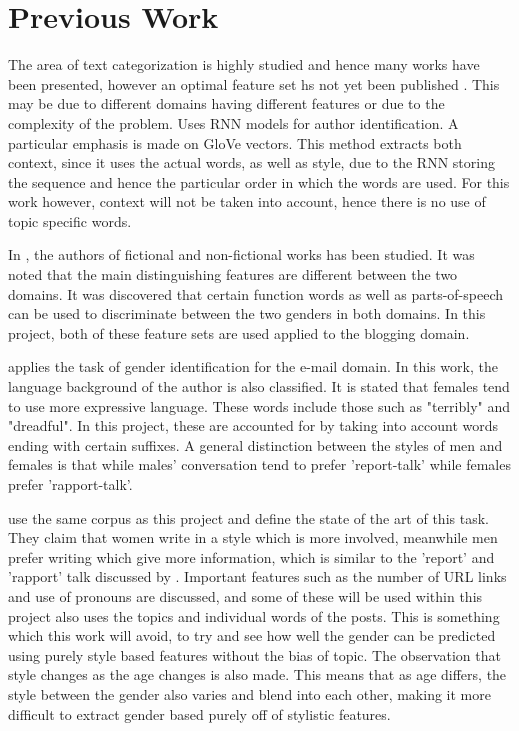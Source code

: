 \section{Previous Work}
The area of text categorization is highly studied and hence many works have been presented, however an optimal feature set hs not yet been published \cite{1}. This may be due to different domains having different features or due to the complexity of the problem. \cite{1} Uses RNN models for author identification. A particular emphasis is made on GloVe vectors. This method extracts both context, since it uses the actual words, as well as style, due to the RNN storing the sequence and hence the particular order in which the words are used. For this work however, context will not be taken into account, hence there is no use of topic specific words.

In \cite{3}, the authors of fictional and non-fictional works has been studied. It was noted that the main distinguishing features are different between the two domains. It was discovered that certain function words as well as parts-of-speech can be used to discriminate between the two genders in both domains. In this project, both of these feature sets are used applied to the blogging domain.

\cite{4} applies the task of gender identification for the e-mail domain. In this work, the language background of the author is also classified. It is stated that females tend to use more expressive language. These words include those such as "terribly" and "dreadful". In this project, these are accounted for by taking into account words ending with certain suffixes. A general distinction between the styles of men and females is that while males' conversation tend to prefer 'report-talk' while females prefer 'rapport-talk'.

\cite{2} use the same corpus as this project and define the state of the art of this task. They claim that women write in a style which is more involved, meanwhile men prefer writing which give more information, which is similar to the 'report' and 'rapport' talk discussed by \cite{4}. Important features such as the number of URL links and use of pronouns are discussed, and some of these will be used within this project \cite{2} also uses the topics and individual words of the posts. This is something which this work will avoid, to try and see how well the gender can be predicted using purely style based features without the bias of topic. The observation that style changes as the age changes is also made. This means that as age differs, the style between the gender also varies and blend into each other, making it more difficult to extract gender based purely off of stylistic features.